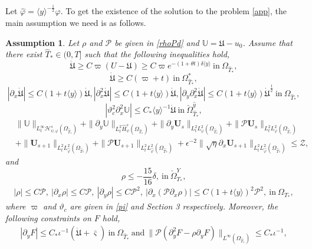 \documentclass{amsart}
\numberwithin{equation}{section}
\newtheorem{assumption}{Assumption}[section]
\newcommand\y{{{\langle y \rangle}}}
\begin{document}
Let $\hat{\varphi}=\y^{-\frac{1}{2}}\varphi$. To get the existence of the solution to the problem \eqref{app}, the main assumption we need is as follows.
\begin{assumption}\label{MA}
Let $\rho$ and $\mathcal{P}$ be given in \eqref{rhoPd} and $\mathbb{U}=\mathfrak{U}-u_{0}$. Assume that there exist $\hat{T}_{*}\in(0,T]$  such that the following inequalities hold,
$$\dot{\mathfrak{U}}\geq C\varpi(U-\mathfrak{U})\geq C\varpi e^{-(1+\theta t)\delta\y}~\text{in}~\Omega_{\hat{T}_{*}},$$
$$\dot{\mathfrak{U}}\geq C(\varpi+t)~\text{in}~\Omega_{\hat{T}_{*}}^{*},$$
$$|\partial_{x}\dot{\mathfrak{U}}|\leq C(1+t\y)\dot{\mathfrak{U}},
  |\partial_{x}^{2}\dot{\mathfrak{U}}|\leq C(1+t\y)\dot{\mathfrak{U}},
  |\partial_{y}\partial_{x}^{2}\dot{\mathfrak{U}}|\leq C(1+t\y)\dot{\mathfrak{U}}^{\frac{1}{2}}~\text{in}~\Omega_{\hat{T}_{*}},$$
$$|\vartheta_{c}^{2}\partial_{x}^{2}\mathbb{U}|\leq C_{*}\y^{-1}\dot{\mathfrak{U}}~\text{in}~\check{\Omega}_{\hat{T}_{*}}^{\hat{y}},$$
\begin{align*}
& \|\mathbb{U}\|_{L_{t}^{\infty}\mathcal{H}_{\psi,\varphi}^{s}(\Omega_{\hat{T}_{*}})}
 +\|\partial_{y}\mathbb{U}\|_{L_{t}^{2}\hat{H}_{\psi}^{s}(\Omega_{\hat{T}_{*}})}
 +\|\partial_{y}\mathbf{U}_{s}\|_{L_{t}^{2}L_{\varphi}^{2}(\Omega_{\hat{T}_{*}})}
 +\|\mathcal{P}\mathbf{U}_{s}\|_{L_{t}^{2}L_{\varphi}^{2}(\Omega_{\hat{T}_{*}})}\\
&+\|\mathbf{U}_{s+1}\|_{L_{t}^{2}L_{\hat{\varphi}}^{2}(\Omega_{\hat{T}_{*}})}
 +\|\mathcal{P}\mathbf{U}_{s+1}\|_{L_{t}^{2}L_{\hat{\varphi}}^{2}(\Omega_{\hat{T}_{*}})}
 +\epsilon^{-2}\|\sqrt{\eta}\partial_{x}\mathbf{U}_{s+1}\|_{L_{t}^{2}L_{\hat{\varphi}}^{2}(\Omega_{\hat{T}_{*}})}
\leq \mathcal{Z},
\end{align*}
and
$$\rho\leq -\frac{15}{16}\delta,~\text{in}~\check{\Omega}_{T_{*}}^{Y},$$
\begin{align*}
|\rho|\leq C\mathcal{P},~|\partial_{x}\rho|\leq C\mathcal{P},~
|\partial_{y}\rho|\leq C\mathcal{P}^{2},~
\left|\partial_{x}(\mathcal{P}\partial_{x}\rho)\right|\leq C(1+t\y)^{2}\mathcal{P}^{2},~\text{in}~\Omega_{T_{*}},
\end{align*}
where $\varpi$ and $\vartheta_{c}$ are given in \eqref{pi} and Section 3 respectively.
Moreover, the following constraints on $F$ hold,
\begin{align*}
|\partial_{y}F|\leq C_{*}\iota^{-1}(\dot{\mathfrak{U}}+\bar{\varsigma})~\text{in}~\Omega_{\hat{T}_{*}}~\text{and}~
\|\mathcal{P}(\partial_{y}^{2}F-\rho\partial_{y}F)\|_{L^{\infty}(\Omega_{\hat{T}_{*}})}\leq C_{*}\iota^{-1},

\end{align*}
\end{assumption}
\end{document}
